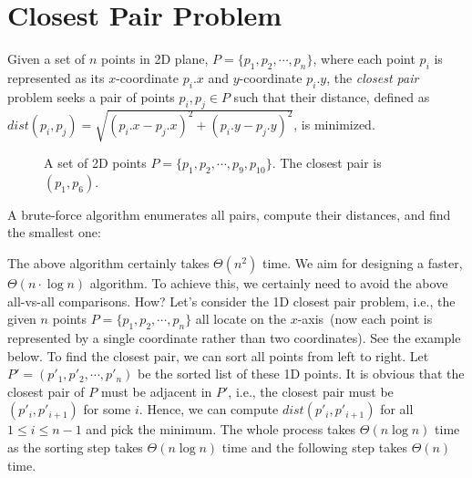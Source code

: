 \setcounter{definition}{0} \setcounter{property}{0} \setcounter{claim}{0} \setcounter{fact}{0} \setcounter{corollary}{0} \setcounter{figure}{0}

\section{Closest Pair Problem}

Given a set of $n$ points in 2D plane, $P = \{p_1, p_2, \cdots, p_n\}$, where each point $p_i$ is
represented as its $x$-coordinate $p_i.x$ and $y$-coordinate $p_i.y$, the \emph{closest pair}
problem seeks a pair of points $p_i, p_j \in P$ such that their distance, 
defined as $dist(p_i, p_j) = \sqrt{(p_i.x - p_j.x)^2 + (p_i.y - p_j.y)^2}$,
is minimized.

\begin{figure}[h!]
\centering{}
\caption{A set of 2D points $P = \{p_1, p_2, \cdots, p_{9}, p_{10}\}$.
The closest pair is $(p_1, p_6)$.}
\label{fig:2d}
\end{figure}


A brute-force algorithm enumerates all pairs, compute their distances,
and find the smallest one: 

\begin{algorithmblock}[0.8\textwidth]
	\xxx
	\xxx
	\xxx
	\xxx
	\xxx
	\xxx
	\xxx
\end{algorithmblock}

The above algorithm certainly takes $\Theta(n^2)$ time.
We aim for designing a faster, $\Theta(n\cdot \log n)$ algorithm.
To achieve this, we certainly need to avoid the above all-vs-all comparisons.
How? Let's consider the 1D closest pair problem, i.e., the given $n$ points $P = \{p_1, p_2, \cdots, p_n\}$
all locate on the $x$-axis~(now each point is represented by a single coordinate rather than two coordinates).
See the example below.
To find the closest pair, we can sort all points from left to right. Let $P' = (p'_1, p'_2, \cdots, p'_n)$ be the
sorted list of these 1D points. It is obvious that the closest pair of $P$ must be adjacent in $P'$, i.e.,
the closest pair must be $(p'_i, p'_{i+1})$ for some $i$. Hence, we can compute $dist(p'_i, p'_{i+1})$ for
all $1\le i \le n - 1$ and pick the minimum. The whole process takes $\Theta(n\log n)$ time as the sorting
step takes $\Theta(n\log n)$ time and the following step takes $\Theta(n)$ time.

